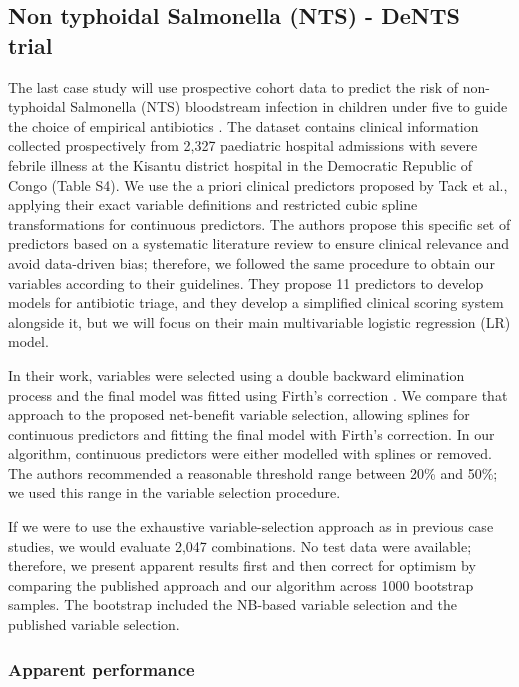 \subsection{Non typhoidal Salmonella (NTS) - DeNTS trial}

The last case study will use prospective cohort data to predict the risk of non-typhoidal Salmonella (NTS) bloodstream infection in children under five to guide the choice of empirical antibiotics \cite{tackDevelopingClinicalPrediction2025}. The dataset contains clinical information collected prospectively from 2,327 paediatric hospital admissions with severe febrile illness at the Kisantu district hospital in the Democratic Republic of Congo (Table S4). We use the a priori clinical predictors proposed by Tack et al., applying their exact variable definitions and restricted cubic spline transformations for continuous predictors. The authors propose this specific set of predictors based on a systematic literature review to ensure clinical relevance and avoid data-driven bias; therefore, we followed the same procedure to obtain our variables according to their guidelines. They propose 11 predictors to develop models for antibiotic triage, and they develop a simplified clinical scoring system alongside it, but we will focus on their main multivariable logistic regression (LR) model.

In their work, variables were selected using a double backward elimination process and the final model was fitted using Firth's correction \cite{puhrFirthsLogisticRegression2017}. We compare that approach to the proposed net-benefit variable selection, allowing splines for continuous predictors and fitting the final model with Firth's correction. In our algorithm, continuous predictors were either modelled with splines or removed. The authors recommended a reasonable threshold range between 20\% and 50\%; we used this range in the variable selection procedure.

If we were to use the exhaustive variable-selection approach as in previous case studies, we would evaluate 2,047 combinations. No test data were available; therefore, we present apparent results first and then correct for optimism by comparing the published approach and our algorithm across 1000 bootstrap samples. The bootstrap included the \gls{NB}-based variable selection and the published variable selection.

\subsubsection{Apparent performance}

